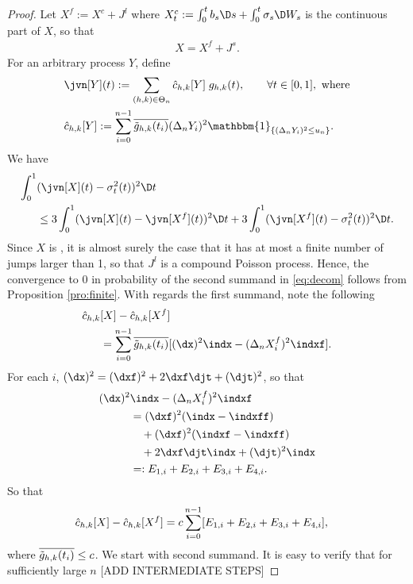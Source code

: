 \begin{proof}
  Let 
   $X^f := X^c + J^l$ 
  where $X^c_t := \int^t_0 b_s \D s + \int^t_0 \sigma_s \D W_s$ is the continuous part of $X$, so that 
\begin{align}
  X = X^f + J^s.
\end{align}
  For an arbitrary process $Y$, define
    \begin{align}
      &\jvn[Y](t) := \sum_{(h,k) \in \Theta_n} \cnhk[Y]\;g_{h,k}(t), \qquad \forall t \in [0,1], \text{ where}\\
      &\cnhk[Y] := \sum_{i =0}^{n-1} \btghki (\Delta_nY_i)^2 \mathbbm{1}_{\{(\Delta_n Y_i)^2 \le u_n\}}.
    \end{align}
    We have
\begin{align}
  \int_0^1 & (\jvn[X](t)  - \sv(t))^2\D t \notag\\
  & \le  3 \int_0^1  (\jvn[X](t)  - \jvn[X^f](t))^2\D t +   3\int_0^1  (\jvn[X^f](t) - \sv(t) )^2\D t. \label{eq:decom}
\end{align}
Since $X$ is \cadlag, it is almost surely the case that it has at most a finite number of jumps larger than 1, so that $J^l$ is a compound Poisson process. Hence, the convergence to 0  in probability of the second summand in \eqref{eq:decom} follows from Proposition \eqref{pro:finite}.  With regards the first summand, note the following
\begin{align}
  \cnhk&[X] - \cnhk[X^f]\notag \\
  &=   \sum_{i =0}^{n-1} \btghki [(\dx)^2 \indx- (\Delta_nX^f_i)^2 \indxf]. \notag
  \label{}
\end{align}
For each $i$, $(\dx)^2 = (\dxf)^2 + 2 \dxf \djt + (\djt)^2$, so that
\begin{align}
 (\dx)^2 &\indx  - (\Delta_nX^f_i)^2 \indxf \notag \\
 &=(\dxf)^2(\indx - \indxff)\notag \\
 &\quad + (\dxf)^2(\indxf - \indxff)\notag \\
 &\quad +   2 \dxf \djt \indx + (\djt)^2 \indx\notag\\
 &=: E_{1,i} + E_{2,i} + E_{3,i} + E_{4,i}.
  \label{}
\end{align}
So that 
\begin{align}
  \hat{c}_{h,k}&[X] - \hat{c}_{h,k}[X^f] = c\sum_{i= 0}^{n -1} [E_{1,i} + E_{2,i} + E_{3,i} + E_{4,i}],\notag
  \label{}
\end{align}
where $\overline{\tilde{g}_{h,k}(t_i)} \le c$.  
We start with second summand. It is easy to verify that for sufficiently large $n$ [ADD INTERMEDIATE STEPS]

\end{proof}
